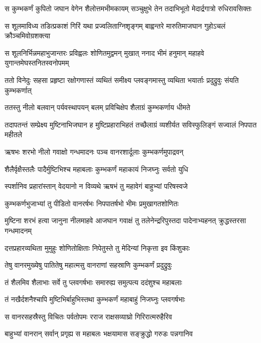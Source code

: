 \twolineshloka
{स कुम्भकर्णं कुपितो जघान वेगेन शैलोत्तमभीमकायम्}
{सञ्चुक्षुभे तेन तदाभिभूतो मेदार्द्रगात्रो रुधिरावसिक्तः} %

\twolineshloka
{स शूलमाविध्य तडित्प्रकाशं गिरिं यथा प्रज्वलिताग्निशृङ्गम्}
{बाह्वन्तरे मारुतिमाजघान गुहोऽचलं क्रौञ्चमिवोग्रशक्त्या} %

\twolineshloka
{स शूलनिर्भिन्नमहाभुजान्तरः प्रविह्वलः शोणितमुद्वमन् मुखात्}
{ननाद भीमं हनुमान् महाहवे युगान्तमेघस्तनितस्वनोपमम्} %

\twolineshloka
{ततो विनेदुः सहसा प्रहृष्टा रक्षोगणास्तं व्यथितं समीक्ष्य}
{प्लवङ्गमास्तु व्यथिता भयार्ताः प्रदुद्रुवुः संयति कुम्भकर्णात्} %

\twolineshloka
{ततस्तु नीलो बलवान् पर्यवस्थापयन् बलम्}
{प्रविचिक्षेप शैलाग्रं कुम्भकर्णाय धीमते} %

\threelineshloka
{तदापतन्तं सम्प्रेक्ष्य मुष्टिनाभिजघान ह}
{मुष्टिप्रहाराभिहतं तच्छैलाग्रं व्यशीर्यत}
{सविस्फुलिङ्गं सज्वालं निपपात महीतले} %

\twolineshloka
{ऋषभः शरभो नीलो गवाक्षो गन्धमादनः}
{पञ्च वानरशार्दूलाः कुम्भकर्णमुपाद्रवन्} %

\twolineshloka
{शैलैर्वृक्षैस्तलैः पादैर्मुष्टिभिश्च महाबलाः}
{कुम्भकर्णं महाकायं निजघ्नुः सर्वतो युधि} %

\twolineshloka
{स्पर्शानिव प्रहारांस्तान् वेदयानो न विव्यथे}
{ऋषभं तु महावेगं बाहुभ्यां परिषस्वजे} %

\twolineshloka
{कुम्भकर्णभुजाभ्यां तु पीडितो वानरर्षभः}
{निपपातर्षभो भीमः प्रमुखागतशोणितः} %

\threelineshloka
{मुष्टिना शरभं हत्वा जानुना नीलमाहवे}
{आजघान गवाक्षं तु तलेनेन्द्ररिपुस्तदा}
{पादेनाभ्यहनत् क्रुद्धस्तरसा गन्धमादनम्} %

\twolineshloka
{दत्तप्रहारव्यथिता मुमुहुः शोणितोक्षिताः}
{निपेतुस्ते तु मेदिन्यां निकृत्ता इव किंशुकाः} %

\twolineshloka
{तेषु वानरमुख्येषु पातितेषु महात्मसु}
{वानराणां सहस्राणि कुम्भकर्णं प्रदुद्रुवुः} %

\twolineshloka
{तं शैलमिव शैलाभाः सर्वे तु प्लवगर्षभाः}
{समारुह्य समुत्पत्य ददंशुश्च महाबलाः} %

\twolineshloka
{तं नखैर्दशनैश्चापि मुष्टिभिर्बाहुभिस्तथा}
{कुम्भकर्णं महाबाहुं निजघ्नुः प्लवगर्षभाः} %

\twolineshloka
{स वानरसहस्रैस्तु विचितः पर्वतोपमः}
{रराज राक्षसव्याघ्रो गिरिरात्मरुहैरिव} %

\twolineshloka
{बाहुभ्यां वानरान् सर्वान् प्रगृह्य स महाबलः}
{भक्षयामास सङ्क्रुद्धो गरुडः पन्नगानिव} %


